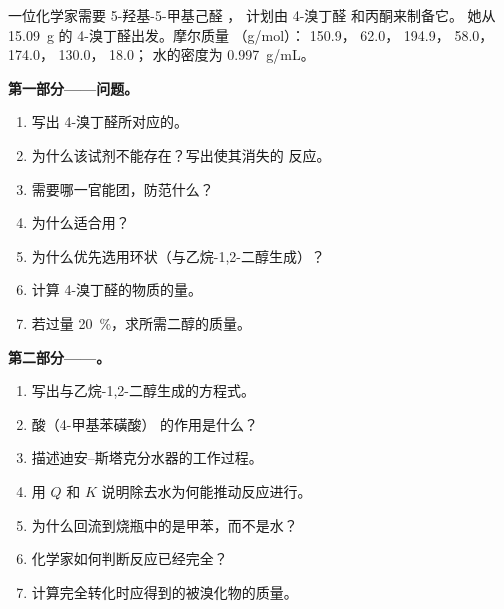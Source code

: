 \begin{problem}
\label{pb:b1:acetals-protection:1}
一位化学家需要 5-羟基-5-甲基己醛 ，
计划由 4-溴丁醛  和丙酮来制备它。
她从 \qty{15.09}{g} 的 4-溴丁醛出发。摩尔质量
（\unit{g/mol}）： 150.9， 62.0， 194.9，
 58.0， 174.0， 130.0， 18.0；
水的密度为 \qty{0.997}{g/mL}。

\medskip
\noindent\textbf{第一部分——问题。}
\begin{enumerate}
  \item 写出 4-溴丁醛所对应的。
  \item 为什么该试剂不能存在？写出使其消失的
        反应。
  \item 需要哪一官能团，防范什么？
  \item 为什么适合用？
  \item 为什么优先选用环状（与乙烷-1,2-二醇生成）？
  \item 计算 4-溴丁醛的物质的量。
  \item 若过量 \qty{20}{\percent}，求所需二醇的质量。
\end{enumerate}

\medskip
\noindent\textbf{第二部分——。}
\begin{enumerate}[resume]
  \item 写出与乙烷-1,2-二醇生成的方程式。
  \item 酸（4-甲基苯磺酸）
        的作用是什么？
  \item 描述迪安–斯塔克分水器的工作过程。
  \item 用 $Q$ 和 $K$ 说明除去水为何能推动反应进行。
  \item 为什么回流到烧瓶中的是甲苯，而不是水？
  \item 化学家如何判断反应已经完全？
  \item 计算完全转化时应得到的被溴化物的质量。
\end{enumerate}


\end{problem}
